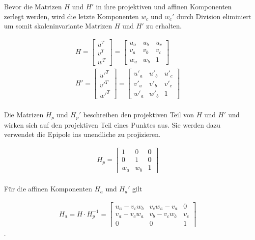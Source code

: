 Bevor die Matrizen $H$ und $H'$ in ihre projektiven und affinen Komponenten zerlegt werden, wird die letzte Komponenten $w_c$ und $w_c'$ durch Division eliminiert um somit skaleninvariante Matrizen $H$ und $H'$ zu erhalten\cite{ZZ,phdextrinsicPara}. 
%

\begin{gather}
	H = \begin{bmatrix}
		u^T\\v^T\\w^T
	\end{bmatrix} =
	\begin{bmatrix}
		u_a&u_b&u_c\\
		v_a&v_b&v_c\\
		w_a&w_b&1
	\end{bmatrix}\\
	H' = \begin{bmatrix}
		u'^T\\v'^T\\w'^T
	\end{bmatrix} =
	\begin{bmatrix}
		u'_a&u'_b&u'_c\\
		v'_a&v'_b&v'_c\\
		w'_a&w'_b&1
	\end{bmatrix}	
\end{gather}\\


Die Matrizen $H_p$ und $H_p'$ beschreiben den projektiven Teil von $H$ und $H'$ und wirken sich auf den projektiven Teil eines Punktes aus. Sie werden dazu verwendet die Epipole ins unendliche zu projizieren\cite{ZZ,phdextrinsicPara}.


\begin{gather}
	H_p = 
	\begin{bmatrix}
		1&0&0\\
		0&1&0\\
		w_a&w_b&1
	\end{bmatrix}
\end{gather}\\

Für die affinen Komponenten $H_a$ und $H_a'$ gilt

\begin{gather}
	H_a= H \cdot H^{-1}_p = 
	\begin{bmatrix}
		u_a-v_cw_b&v_cw_a-v_a&0\\
		v_a-v_cw_a&v_b-v_cw_b&v_c\\
		0&0&1
	\end{bmatrix}
\end{gather}
.


